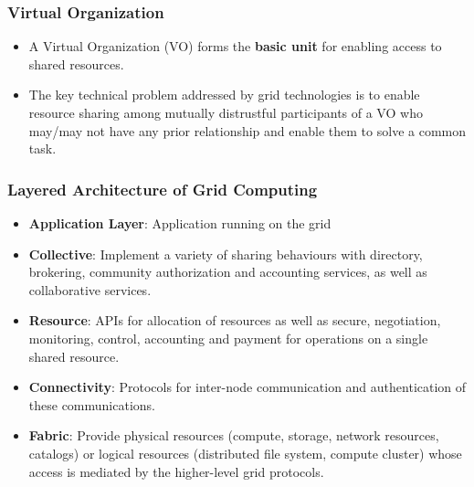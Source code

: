\documentclass{article}
\begin{document}
\subsubsection{Virtual Organization}
\begin{itemize}
    \item A Virtual Organization (VO) forms the \textbf{basic unit} for enabling access to shared resources. 
    
    \item The key technical problem addressed by grid technologies is to enable resource sharing among mutually distrustful participants of a VO who may/may not have any prior relationship and enable them to solve a common task.
\end{itemize}

\subsubsection{Layered Architecture of Grid Computing}
\begin{itemize}
    \item \textbf{Application Layer}: Application running on the grid
    
    \item \textbf{Collective}: Implement a variety of sharing behaviours with directory, brokering, community authorization and accounting services, as well as collaborative services. 
    
    \item \textbf{Resource}: APIs for allocation of resources as well as secure, negotiation, monitoring, control, accounting and payment for operations on a single shared resource. 
    
    \item \textbf{Connectivity}: Protocols for inter-node communication and authentication of these communications. 
    
    \item \textbf{Fabric}: Provide physical resources (compute, storage, network resources, catalogs) or logical resources (distributed file system, compute cluster) whose access is mediated by the higher-level grid protocols.
\end{itemize}
\end{document}
